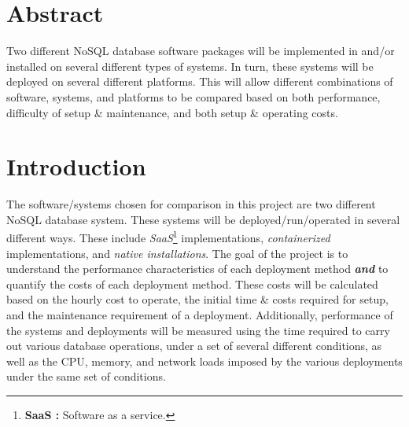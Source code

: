 \documentclass{article}[12pt]
\numberwithin{equation}{section}
\begin{document}
\begin{flushleft}


\section*{Abstract}
\begin{spacing}{1.5}
Two different NoSQL database software  packages will be implemented in and/or  installed on several different types of  systems. In turn, these systems will  be deployed on several different  platforms. This will allow different  combinations of software, systems,  and platforms to be compared based  on both performance, difficulty of setup  \& maintenance, and both setup \& operating costs.
\end{spacing}







\section{Introduction}
\begin{spacing}{1.5}
	The software/systems chosen for comparison in this project are two different NoSQL database system.  These systems will be deployed/run/operated in several different ways.  These include \emph{SaaS}\footnote{\textbf{SaaS :} Software as a service.} implementations, \emph{containerized} implementations, and \emph{native installations}.  The goal of the project is to understand the performance characteristics of each deployment method \emph{\textbf{and}} to quantify the costs of each deployment method.  These costs will be calculated based on the hourly cost to operate, the initial time \& costs required for setup, and the maintenance requirement of a deployment.  Additionally, performance of the systems and deployments will be measured using the time required to carry out various database operations, under a set of several different conditions, as well as the CPU, memory, and network loads imposed by the various deployments under the same set of conditions.
\end{spacing}









\end{flushleft}
\end{document}
